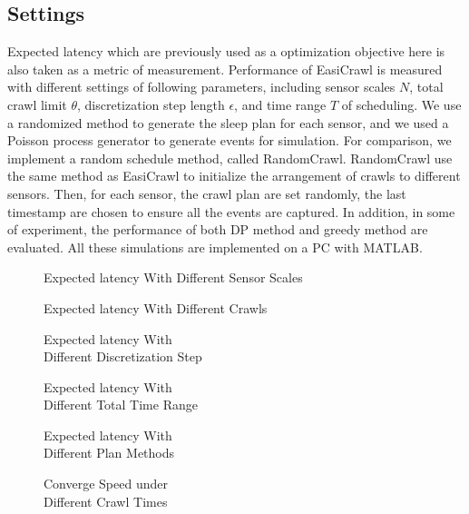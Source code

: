 \documentclass[conference]{IEEEtran}
\begin{document}
\subsection{Settings}
Expected latency which are previously used as a optimization objective here is also taken as a metric of measurement.
Performance of EasiCrawl is measured with different settings of following parameters, including sensor scales $N$, total crawl limit $\theta$, discretization step length $\epsilon$, and time range $T$ of scheduling. 
We use a randomized method to generate the sleep plan for each sensor, and we used a Poisson process generator to generate events for simulation.
For comparison, we implement a random schedule method, called RandomCrawl. 
RandomCrawl use the same method as EasiCrawl to initialize the arrangement of crawls to different sensors. 
Then, for each sensor, the crawl plan are set randomly, the last timestamp are chosen to ensure all the events are captured. 
In addition, in some of experiment, the performance of both DP method and greedy method are evaluated.
All these simulations are implemented on a PC with MATLAB.
\begin{figure*}
		
		\captionsetup{justification=centering}
		\caption{Expected latency With Different Sensor Scales}
		\label{fig:test1_sensorscale}
	\endminipage\hfill
		
		\captionsetup{justification=centering}
		\caption{Expected latency With Different Crawls}
		\label{fig:test2_totalcrawl}
	\endminipage\hfill
		
		\captionsetup{justification=centering}
		\caption{Expected latency With \\Different Discretization Step}
		\label{fig:test3_discretestep}
	\endminipage
	
		
		\captionsetup{justification=centering}
		\caption{Expected latency With \\Different Total Time Range}
		\label{fig:test4_timerange}
	\endminipage\hfill
		
		\captionsetup{justification=centering}
		\caption{Expected latency With \\Different Plan Methods}
		\label{fig:test5_sensortype}
	\endminipage\hfill
		
		\captionsetup{justification=centering}
		\caption{Converge Speed under \\Different Crawl Times}
		\label{fig:test6_convergespeed}
	\endminipage	
	\vspace{-1.0em}
\end{figure*}
\end{document}
